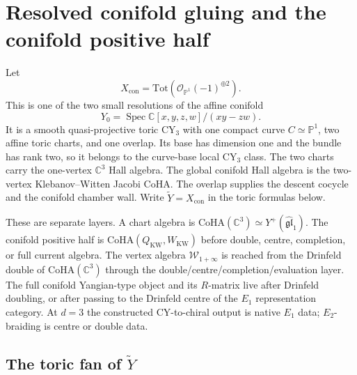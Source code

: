 \providecommand{\C}{\mathbb{C}}
\providecommand{\Z}{\mathbb{Z}}
\providecommand{\N}{\mathbb{N}}
\providecommand{\bP}{\mathbb{P}}
\providecommand{\cO}{\mathcal{O}}
\providecommand{\Tot}{\mathrm{Tot}}
\providecommand{\ghat}{\widehat{\mathfrak{gl}}_{1}}
\providecommand{\Yplus}{Y^{+}}
\providecommand{\CoHA}{\mathrm{CoHA}}
\providecommand{\Hilb}{\mathrm{Hilb}}
\providecommand{\End}{\mathrm{End}}
\providecommand{\Rep}{\mathrm{Rep}}
\providecommand{\kch}{\kappa_{\mathrm{ch}}}
\providecommand{\kcat}{\kappa_{\mathrm{cat}}}
\providecommand{\tr}{\mathrm{tr}}

\section*{Resolved conifold gluing and the conifold positive half}
\label{sec:resolved-conifold-gluing-positive-half}

Let
\[
  X_{\mathrm{con}}
  =
  \Tot\!\left(\cO_{\bP^1}(-1)^{\oplus 2}\right).
\]
This is one of the two small resolutions of the affine conifold
\[
  Y_0=\operatorname{Spec}\C[x,y,z,w]/(xy-zw).
\]
It is a smooth quasi-projective toric CY$_3$ with one compact curve
$C\simeq\bP^1$, two affine toric charts, and one overlap.  Its base has
dimension one and the bundle has rank two, so it belongs to the
curve-base local CY$_3$ class.
The two charts carry the one-vertex $\C^3$ Hall algebra.  The global
conifold Hall algebra is the two-vertex Klebanov--Witten Jacobi CoHA.
The overlap supplies the descent cocycle and the conifold chamber wall.
Write $\widetilde Y=X_{\mathrm{con}}$ in the toric formulas below.

These are separate layers.  A chart algebra is
$\CoHA(\C^3)\simeq \Yplus(\ghat)$.  The conifold positive half is
$\CoHA(Q_{\mathrm{KW}},W_{\mathrm{KW}})$ before double, centre,
completion, or full current algebra.  The vertex algebra
$\mathcal W_{1+\infty}$ is reached from the Drinfeld double of
$\CoHA(\C^3)$ through the
double/centre/completion/evaluation layer.  The full conifold
Yangian-type object and its $R$-matrix live after Drinfeld doubling, or
after passing to the Drinfeld centre of the $E_1$ representation
category.  At $d=3$ the constructed CY-to-chiral output is native
$E_1$ data; $E_2$-braiding is centre or double data.

\subsection*{The toric fan of $\widetilde{Y}$}

